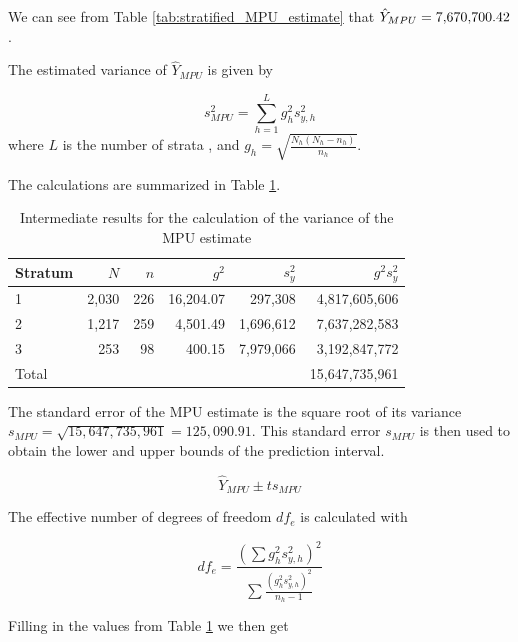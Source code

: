 We can see from Table \ref{tab:stratified_MPU_estimate} that $\hat{Y}_{MPU} = \AuxStratifiedMpuEstimate$.

\bigskip
The estimated variance of $\hat{Y}_{MPU}$ is given by

\begin{equation}
s^2_{MPU} = \sum_{h = 1}^{L}g_h^2 s_{y,h}^2
\label{eq:estimated_variance_MPU}
\end{equation}
where $L$ is the number of strata , and $g_h = \sqrt{\frac{N_h(N_h - n_h)}{n_h}}$.

\bigskip
The calculations are summarized in Table \ref{tab:intermediate_results_variance}.

\begin{table}[htbp]
\centering
\caption{Intermediate results for the calculation of the variance of the MPU estimate}
\label{tab:intermediate_results_variance}

\begin{tabularx}{\textwidth}{@{}lrrrrr@{}}
\toprule
Stratum &
$N$ &
$n$ &
$g^2$ &
$s_y^2$ &
$g^2 s_y^2$ \\
\midrule
1 & 2,030 & 226 & 16,204.07 &   297,308 &  4,817,605,606 \\
2 & 1,217 & 259 &  4,501.49 & 1,696,612 &  7,637,282,583 \\
3 &   253 &  98 &    400.15 & 7,979,066 &  3,192,847,772 \\
\midrule
Total & & & & & 15,647,735,961 \\
\bottomrule
\end{tabularx}
\end{table}

\bigskip
The standard error of the MPU estimate is the square root of its variance $s_{MPU} = \sqrt{15,647,735,961} = 125,090.91.$ This standard error $s_{MPU}$ is then used to obtain the lower and upper bounds of the prediction interval.

\begin{equation}
\hat{Y}_{MPU} \pm t s_{MPU} 
\label{eq:pred_interval_strat_MPU}
\end{equation}

The effective number of degrees of freedom $df_e$ is calculated with

\begin{equation}
df_e = \frac{(\sum g_h^2 s_{y,h}^2)^2}{\sum \frac{(g_h^2 s_{y,h}^2)^2}{n_h - 1}}
\label{eq:df_effective}
\end{equation}

Filling in the values from Table \ref{tab:intermediate_results_variance} we then get

